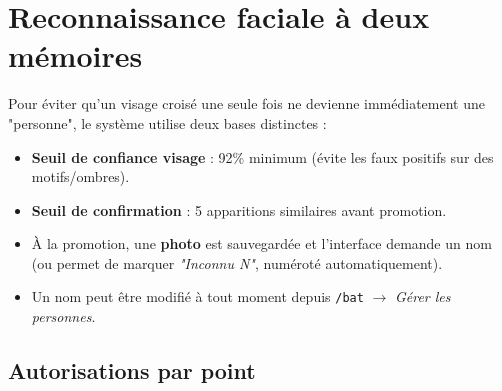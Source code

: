 \documentclass[11pt,a4paper]{article}
\begin{document}
\section{Reconnaissance faciale \`a deux m\'emoires}
\label{sec:visages}

Pour \'eviter qu'un visage crois\'e une seule fois ne devienne imm\'ediatement une "personne", le
syst\`eme utilise deux bases distinctes :

\begin{center}
\end{center}

\begin{itemize}[leftmargin=1.2em, itemsep=3pt]
  \item \textbf{Seuil de confiance visage} : 92\% minimum (\'evite les faux positifs sur des motifs/ombres).
  \item \textbf{Seuil de confirmation} : 5 apparitions similaires avant promotion.
  \item \`A la promotion, une \textbf{photo} est sauvegard\'ee et l'interface demande un nom (ou permet de
  marquer \emph{"Inconnu N"}, num\'erot\'e automatiquement).
  \item Un nom peut \^etre modifi\'e \`a tout moment depuis \texttt{/bat} $\rightarrow$ \emph{G\'erer les personnes}.
\end{itemize}

\subsection*{Autorisations par point}
\end{document}
